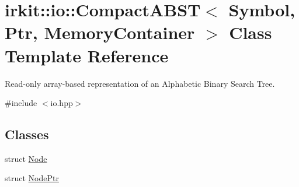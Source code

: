 \hypertarget{classirkit_1_1io_1_1CompactABST}{}\section{irkit\+:\+:io\+:\+:Compact\+A\+B\+ST$<$ Symbol, Ptr, Memory\+Container $>$ Class Template Reference}
\label{classirkit_1_1io_1_1CompactABST}


Read-\/only array-\/based representation of an Alphabetic Binary Search Tree.  




{\ttfamily \#include $<$io.\+hpp$>$}

\subsection*{Classes}
\begin{DoxyCompactItemize}
\item 
struct \mbox{\hyperlink{structirkit_1_1io_1_1CompactABST_1_1Node}{Node}}
\item 
struct \mbox{\hyperlink{structirkit_1_1io_1_1CompactABST_1_1NodePtr}{Node\+Ptr}}
\end{DoxyCompactItemize}
